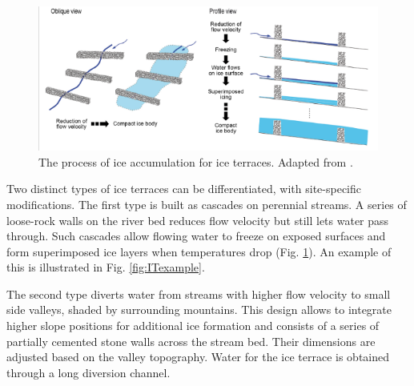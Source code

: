 \begin{figure}[htb]
	\centering
	\includegraphics[width=\textwidth]{figs/IT_science.png}

	\caption{ The process of ice accumulation for ice terraces. Adapted from
		\citet{nusserSociohydrologyArtificialGlaciers2019}.}

	\label{fig:ITscience}
\end{figure}

Two distinct types of ice terraces can be differentiated, with site-specific modifications. The first type is built as cascades on perennial streams. A series of loose-rock walls on
the river bed reduces flow velocity but still lets water pass through. Such cascades allow flowing water to
freeze on exposed surfaces and form superimposed ice layers when temperatures drop (Fig.
\ref{fig:ITscience}). An example of this is illustrated in Fig. \ref{fig:ITexample}.

The second type diverts water from streams with higher flow velocity to small side valleys, shaded by
surrounding mountains. This design allows to integrate higher slope positions for additional ice formation and
consists of a series of partially cemented stone walls across the stream bed. Their dimensions are adjusted
based on the valley topography. Water for the ice terrace is obtained through a long diversion channel.


